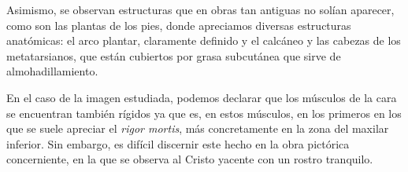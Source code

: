 Asimismo, se observan estructuras que en obras tan antiguas no solían aparecer, como son las plantas de los pies, donde apreciamos diversas estructuras anatómicas: el arco plantar, claramente definido y el calcáneo y las cabezas de los metatarsianos, que están cubiertos por grasa subcutánea que sirve de almohadillamiento.

 En el caso de la imagen estudiada, podemos declarar que los músculos de la cara se encuentran también rígidos ya que es, en estos músculos, en los primeros en los que se suele apreciar el \textit{rigor mortis}, más concretamente en la zona del maxilar inferior. Sin embargo, es difícil discernir este hecho en la obra pictórica concerniente, en la que se observa al Cristo yacente con un rostro tranquilo.
